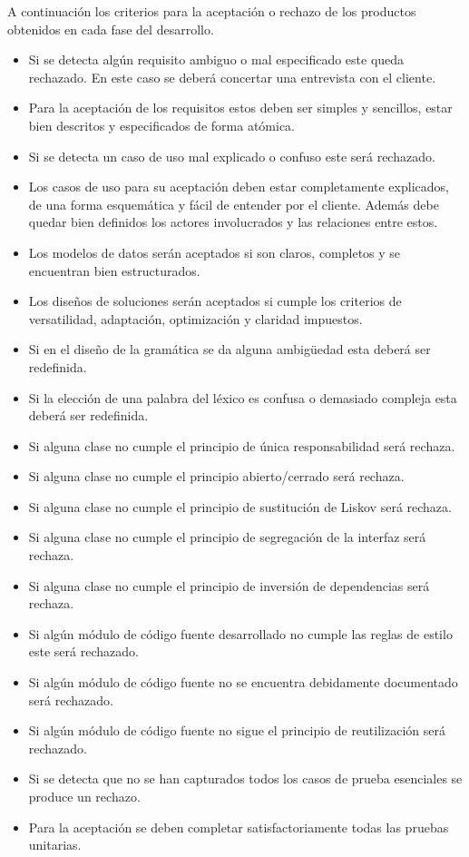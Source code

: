 A continuación los criterios para la aceptación o rechazo de los productos obtenidos en cada fase del desarrollo.

\begin{itemize}
\item Si se detecta algún requisito ambiguo o mal especificado este queda rechazado. En este caso se deberá concertar una entrevista con el cliente.
\item Para la aceptación de los requisitos estos deben ser simples y sencillos, estar bien descritos y especificados de forma atómica.
\item Si se detecta un caso de uso mal explicado o confuso este será rechazado. 
\item Los casos de uso para su aceptación deben estar completamente explicados, de una forma esquemática y fácil de entender por el cliente. Además debe quedar bien definidos 
los actores involucrados y las relaciones entre estos. 
\item Los modelos de datos serán aceptados si son claros, completos y se encuentran bien estructurados.
\item Los diseños de soluciones serán aceptados si cumple los criterios de versatilidad, adaptación, optimización y claridad impuestos.
\item Si en el diseño de la gramática se da alguna ambigüedad esta deberá ser redefinida.
\item Si la elección de una palabra del léxico es confusa o demasiado compleja esta deberá ser redefinida.
\item Si alguna clase no cumple el principio de única responsabilidad será rechaza.
\item Si alguna clase no cumple el principio abierto/cerrado será rechaza.
\item Si alguna clase no cumple el principio de sustitución de Liskov será rechaza.
\item Si alguna clase no cumple el principio de segregación de la interfaz será rechaza.
\item Si alguna clase no cumple el principio de inversión de dependencias será rechaza.
\item Si algún módulo de código fuente desarrollado no cumple las reglas de estilo este será rechazado.
\item Si algún módulo de código fuente no se encuentra debidamente documentado será rechazado.
\item Si algún módulo de código fuente no sigue el principio de reutilización será rechazado.
\item Si se detecta que no se han capturados todos los casos de prueba esenciales se produce un rechazo.
\item Para la aceptación se deben completar satisfactoriamente todas las pruebas unitarias.
\end{itemize}
